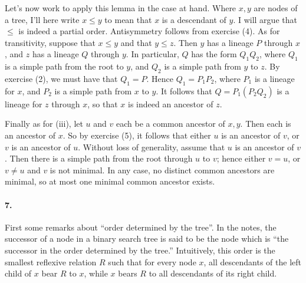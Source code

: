 \documentclass[
]{article}
\begin{document}
Let's now work to apply this lemma in the case at hand.  Where $x,y$ are nodes of a tree, I'll here write $x\leq y$ to mean that $x$ is a descendant of $y$.  I will argue that $\leq$ is indeed a partial order.  Antisymmetry follows from exercise (4).  As for transitivity, suppose that $x\leq y$ and that $y\leq z$.  Then $y$ has a lineage $P$ through $x$, and $z$ has a lineage $Q$ through $y$.  In particular, $Q$ has the form $Q_1Q_2$, where $Q_1$ is a simple path from the root to $y$, and $Q_2$ is a simple path from $y$ to $z$.  By exercise (2), we must have that $Q_1=P$.  Hence $Q_1=P_1P_2$, where $P_1$ is a lineage for $x$, and $P_2$ is a simple path from $x$ to $y$.  It follows that $Q=P_1(P_2Q_2)$ is a lineage for $z$ through $x$, so that $x$ is indeed an ancestor of $z$.





Finally as for (iii), let $u$ and $v$ each be a common ancestor of $x,y$.  Then each is an ancestor of $x$.  So by exercise (5), it follows that either $u$ is an ancestor of $v$, or $v$ is an ancestor of $u$.  Without loss of generality, assume that $u$ is an ancestor of $v$.  Then there is a simple path from the root through $u$ to $v$; hence either $v=u$, or $v\neq u$ and $v$ is not minimal.  In any case, no distinct common ancestors are minimal, so at most one minimal common ancestor exists.


\paragraph{7.} 

First some remarks about ``order determined by the tree''. In the notes, the successor of a node in a binary search tree is said to be the node which is ``the successor in the order determined by the tree.''  Intuitively, this order is the smallest reflexive relation $R$ such that for every node $x$, all descendants of the left child of $x$ bear $R$ to $x$, while $x$ bears $R$ to all descendants of its right child.
\end{document}
